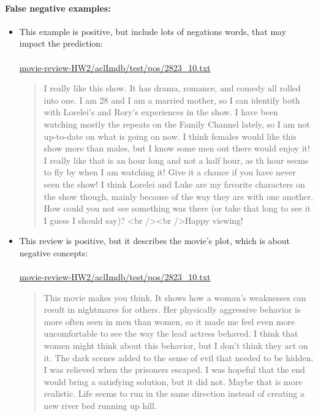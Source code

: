 \documentclass{article}
\begin{document}
\paragraph{False negative examples:}

\begin{itemize}
    \item This example is positive, but include lots of negations words, that may impact the prediction:

    \paragraph{} \url{movie-review-HW2/aclImdb/test/pos/2823_10.txt}
    
    \begin{quotation}
        I really like this show. It has drama, romance, and comedy all rolled into one. I am 28 and I am a married mother, so I can identify both with Lorelei's and Rory's experiences in the show. I have been watching mostly the repeats on the Family Channel lately, so I am not up-to-date on what is going on now. I think females would like this show more than males, but I know some men out there would enjoy it! I really like that is an hour long and not a half hour, as th hour seems to fly by when I am watching it! Give it a chance if you have never seen the show! I think Lorelei and Luke are my favorite characters on the show though, mainly because of the way they are with one another. How could you not see something was there (or take that long to see it I guess I should say)? <br /><br />Happy viewing!
    \end{quotation}
    

    \item This review is positive, but it describes the movie's plot, which is about negative concepts:
    
    \paragraph{} \url{movie-review-HW2/aclImdb/test/pos/2823_10.txt}
    
    \begin{quotation}
        This movie makes you think. It shows how a woman's weaknesses can result in nightmares for others. Her physically aggressive behavior is more often seen in men than women, so it made me feel even more uncomfortable to see the way the lead actress behaved. I think that women might think about this behavior, but I don't think they act on it. The dark scenes added to the sense of evil that needed to be hidden. I was relieved when the prisoners escaped. I was hopeful that the end would bring a satisfying solution, but it did not. Maybe that is more realistic. Life seems to run in the same direction instead of creating a new river bed running up hill.
    \end{quotation}
\end{itemize}
\end{document}
